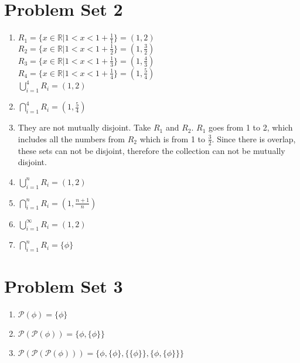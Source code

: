 \documentclass[12pt]{article}
\begin{document}
\section*{Problem Set 2}
\begin{enumerate}[label = 26\alph*.]

    \item 
        $R_1 = \{x \in \mathbb{R} | 1 < x < 1 + \frac{1}{1}\} = (1, 2)$ \\
        $R_2 = \{x \in \mathbb{R} | 1 < x < 1 + \frac{1}{2}\} = (1, \frac{3}{2})$ \\
        $R_3 = \{x \in \mathbb{R} | 1 < x < 1 + \frac{1}{3}\} = (1, \frac{4}{3})$ \\
        $R_4 = \{x \in \mathbb{R} | 1 < x < 1 + \frac{1}{4}\} = (1, \frac{5}{4})$ \\
        $\bigcup\limits_{i=1}^{4} R_i = (1, 2)$
    \item
        $\bigcap\limits_{i=1}^{4} R_i = (1, \frac{5}{4})$
    \item 
        They are not mutually disjoint. Take $R_1$ and $R_2$. $R_1$ goes from 1 to 2, which
        includes all the numbers from $R_2$ which is from 1 to $\frac{3}{2}$. Since there is
        overlap, these sets can not be disjoint, therefore the collection can not be mutually
        disjoint.
    \item
        $\bigcup\limits_{i=1}^{n} R_i = (1, 2)$
    \item 
        $\bigcap\limits_{i=1}^{n} R_i = (1, \frac{n + 1}{n})$
    \item 
        $\bigcup\limits_{i=1}^{\infty} R_i = (1, 2)$
    \item 
        $\bigcap\limits_{i=1}^{n} R_i = \{\phi\}$

\end{enumerate}

\section*{Problem Set 3}
\begin{enumerate}[label = 33\alph*.]
    \item 
        $\mathscr{P}(\phi) = \{\phi\}$
    \item 
        $\mathscr{P}(\mathscr{P}(\phi)) = \{\phi, \{\phi\}\}$
    \item 
        $\mathscr{P}(\mathscr{P}(\mathscr{P}(\phi))) = \{\phi, \{\phi\}, \{\{\phi\}\},
        \{\phi, \{\phi\}\} \}$
\end{enumerate}
\end{document}
